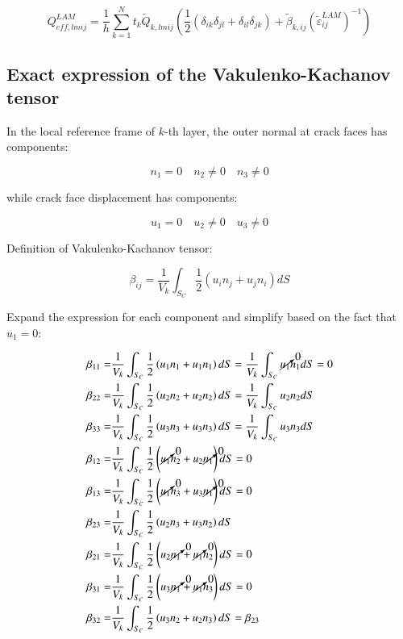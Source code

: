 \documentclass[review]{elsarticle}
\begin{document}
\begin{equation}
Q_{eff,lmij}^{LAM}=\frac{1}{h}\sum_{k=1}^{N}t_{k}\tilde{Q}_{k,lmij}\left(\frac{1}{2}\left(\delta_{ik}\delta_{jl}+\delta_{il}\delta_{jk}\right)+\tilde{\beta}_{k,ij}\left(\tilde{\varepsilon}_{ij}^{LAM}\right)^{-1}\right)
\end{equation}

\subsection{Exact expression of the Vakulenko-Kachanov tensor}

In the local reference frame of $k$-th layer, the outer normal at crack faces has components:

\begin{equation}
n_{1}=0\quad n_{2}\neq0\quad n_{3}\neq0
\end{equation}

while crack face displacement has components:

\begin{equation}
u_{1}=0\quad u_{2}\neq0\quad u_{3}\neq0
\end{equation}

Definition of Vakulenko-Kachanov tensor:

\begin{equation}
\beta_{ij}=\frac{1}{V_{k}}\int_{S_{C}}\frac{1}{2}\left(u_{i}n_{j}+u_{j}n_{i}\right)dS
\end{equation}

Expand the expression for each component and simplify based on the fact that $u_{1}=0$:

\begin{equation}
\begin{aligned}
\beta_{11}=&\frac{1}{V_{k}}\int_{S_{C}}\frac{1}{2}\left(u_{1}n_{1}+u_{1}n_{1}\right)dS=\frac{1}{V_{k}}\int_{S_{C}}\cancelto{0}{u_{1}}n_{1}dS=0\\
\beta_{22}=&\frac{1}{V_{k}}\int_{S_{C}}\frac{1}{2}\left(u_{2}n_{2}+u_{2}n_{2}\right)dS=\frac{1}{V_{k}}\int_{S_{C}}u_{2}n_{2}dS\\
\beta_{33}=&\frac{1}{V_{k}}\int_{S_{C}}\frac{1}{2}\left(u_{3}n_{3}+u_{3}n_{3}\right)dS=\frac{1}{V_{k}}\int_{S_{C}}u_{3}n_{3}dS\\
\beta_{12}=&\frac{1}{V_{k}}\int_{S_{C}}\frac{1}{2}\left(\cancelto{0}{u_{1}}n_{2}+u_{2}\cancelto{0}{n_{1}}\right)dS=0\\
\beta_{13}=&\frac{1}{V_{k}}\int_{S_{C}}\frac{1}{2}\left(\cancelto{0}{u_{1}}n_{3}+u_{3}\cancelto{0}{n_{1}}\right)dS=0\\
\beta_{23}=&\frac{1}{V_{k}}\int_{S_{C}}\frac{1}{2}\left(u_{2}n_{3}+u_{3}n_{2}\right)dS\\
\beta_{21}=&\frac{1}{V_{k}}\int_{S_{C}}\frac{1}{2}\left(u_{2}\cancelto{0}{n_{1}}+\cancelto{0}{u_{1}}n_{2}\right)dS=0\\
\beta_{31}=&\frac{1}{V_{k}}\int_{S_{C}}\frac{1}{2}\left(u_{3}\cancelto{0}{n_{1}}+\cancelto{0}{u_{1}}n_{3}\right)dS=0\\
\beta_{32}=&\frac{1}{V_{k}}\int_{S_{C}}\frac{1}{2}\left(u_{3}n_{2}+u_{2}n_{3}\right)dS=\beta_{23}\\
\end{aligned}
\end{equation}
\end{document}
